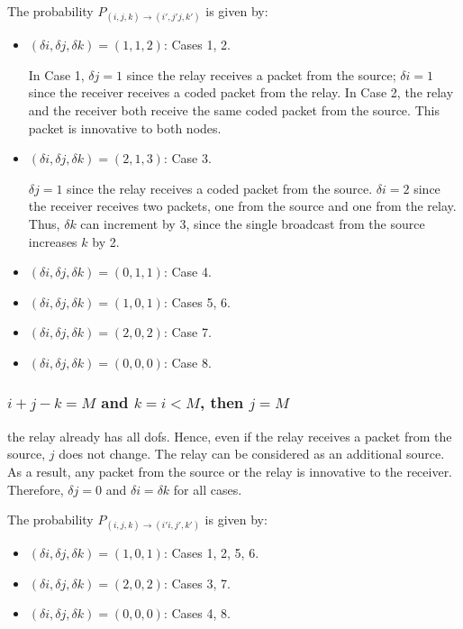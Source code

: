 The probability $P_{(i,j,k) \rightarrow (i',j' j,k')}$ is given by:
	    \begin{itemize}
            \item $(\delta i,\delta j,\delta k)=(1,1,2)$: Cases 1, 2.

                In Case 1, $\delta j = 1$ since the relay receives a  packet from the source; $\delta i = 1$ since the receiver receives a coded packet from the relay.                 In Case 2, the relay and the receiver both receive the same coded packet from the source. This packet is innovative to both nodes.

            \item $(\delta i,\delta j,\delta k)=(2,1,3)$: Case 3. 
            
               $\delta j = 1$ since the relay receives a coded packet from the source. $\delta i = 2$ since the receiver receives two packets, one from the source and one from the relay. Thus, $\delta k$ can increment by 3, since the single broadcast from the source increases $k$ by 2. 

            \item $(\delta i,\delta j,\delta k)=(0,1,1)$: Case 4. 


            \item $(\delta i,\delta j,\delta k)=(1,0,1)$: Cases 5, 6.

            \item $(\delta i,\delta j,\delta k)=(2,0,2)$: Case 7.

	    \item $(\delta i,\delta j,\delta k)=(0,0,0)$: Case 8.
        \end{itemize}

\subsubsection{$i+j-k=M$ and $k=i<M$, then $j=M$} the relay already has all dofs. Hence, even if the relay receives a packet from the source, $j$ does not change. The relay can be considered as an additional source. As a result, any packet from the source or the relay is innovative to the receiver. Therefore, $\delta j = 0$ and $\delta i = \delta k$ for all cases.

The probability $P_{(i,j,k) \rightarrow (i' i,j',k')}$ is given by:
	    \begin{itemize}
            \item $(\delta i,\delta j,\delta k)=(1,0,1)$: Cases 1, 2, 5, 6.
            \item $(\delta i,\delta j,\delta k)=(2,0,2)$: Cases 3, 7.
            \item $(\delta i,\delta j,\delta k)=(0,0,0)$: Cases 4, 8.
	    \end{itemize}

